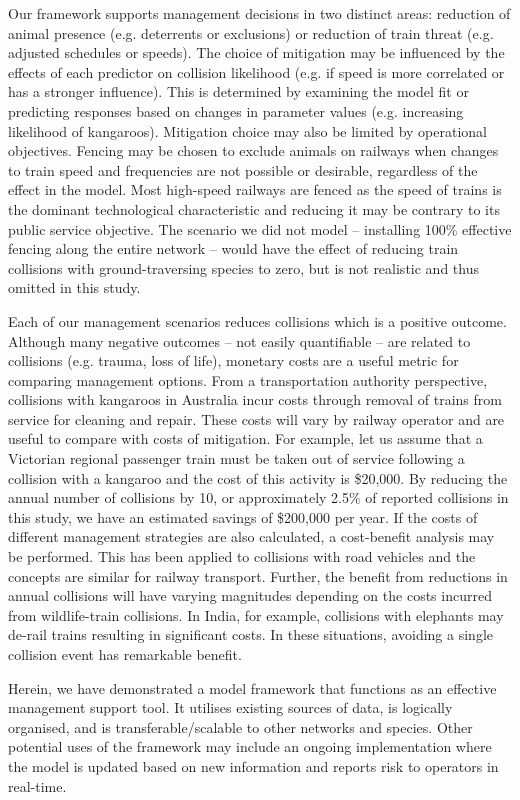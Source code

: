 Our framework supports management decisions in two distinct areas: reduction of animal presence (e.g. deterrents or exclusions) or reduction of train threat (e.g. adjusted schedules or speeds).  The choice of mitigation may be influenced by the effects of each predictor on collision likelihood (e.g. if speed is more correlated or has a stronger influence).  This is determined by examining the model fit or predicting responses based on changes in parameter values (e.g. increasing likelihood of kangaroos).  Mitigation choice may also be limited by operational objectives.  Fencing may be chosen to exclude animals on railways when changes to train speed and frequencies are not possible or desirable, regardless of the effect in the model. Most high-speed railways are fenced \citep{camp09} as the speed of trains is the dominant technological characteristic and reducing it may be contrary to its public service objective. The scenario we did not model -- installing 100\% effective fencing along the entire network -- would have the effect of reducing train collisions with ground-traversing species to zero, but is not realistic and thus omitted in this study.

Each of our management scenarios reduces collisions which is a positive outcome.  Although many negative outcomes -- not easily quantifiable -- are related to collisions (e.g. trauma, loss of life), monetary costs are a useful metric for comparing management options. From a transportation authority perspective, collisions with kangaroos in Australia incur costs through removal of trains from service for cleaning and repair.  These costs will vary by railway operator and are useful to compare with costs of mitigation.  For example, let us assume that a Victorian regional passenger train must be taken out of service following a collision with a kangaroo and the cost of this activity is \$20,000.  By reducing the annual number of collisions by 10, or approximately 2.5\% of reported collisions in this study, we have an estimated savings of \$200,000 per year.  If the costs of different management strategies are also calculated, a cost-benefit analysis may be performed.  This has been applied to collisions with road vehicles \citep{huij09} and the concepts are similar for railway transport. Further, the benefit from reductions in annual collisions will have varying magnitudes depending on the costs incurred from wildlife-train collisions. In India, for example, collisions with elephants may de-rail trains \citep{dors15} resulting in significant costs. In these situations, avoiding a single collision event has remarkable benefit.

Herein, we have demonstrated a model framework that functions as an effective management support tool. It utilises existing sources of data, is logically organised, and is transferable/scalable to other networks and species. Other potential uses of the framework may include an ongoing implementation where the model is updated based on new information and reports risk to operators in real-time.